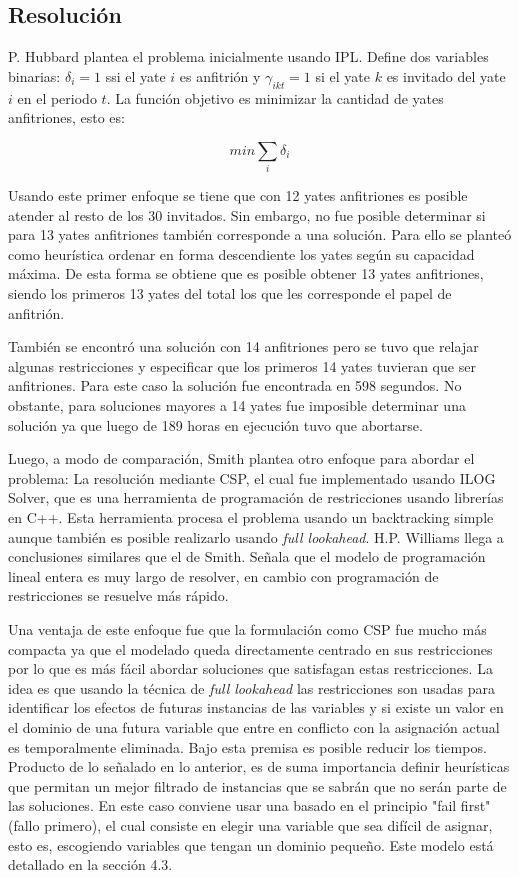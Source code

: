 \documentclass[letter, 10pt]{article}
\begin{document}
\subsection{Resolución}

P. Hubbard plantea el problema inicialmente usando IPL\cite{Smith1996}. Define dos variables binarias: $\delta_i=1$ ssi el yate $i$ es anfitrión y $\gamma_{ikt}=1$ si el yate $k$ es invitado del yate $i$ en el periodo $t$. La función objetivo es minimizar la cantidad de yates anfitriones, esto es:

\begin{equation}
    min \sum_i \delta_i
\end{equation}

Usando este primer enfoque se tiene que con 12 yates anfitriones es posible atender al resto de los 30 invitados. Sin embargo, no fue posible determinar si para 13 yates anfitriones también corresponde a una solución. Para ello se planteó como heurística ordenar en forma descendiente los yates según su capacidad máxima. De esta forma se obtiene que es posible obtener 13 yates anfitriones, siendo los primeros 13 yates del total los que les corresponde el papel de anfitrión.

También se encontró una solución con 14 anfitriones pero se tuvo que relajar algunas restricciones y especificar que los primeros 14 yates tuvieran que ser anfitriones. Para este caso la solución fue encontrada en 598 segundos. No obstante, para soluciones mayores a 14 yates fue imposible determinar una solución ya que luego de 189 horas en ejecución tuvo que abortarse.

Luego, a modo de comparación, Smith plantea otro enfoque para abordar el problema: La resolución mediante CSP, el cual fue implementado usando ILOG Solver\cite{Puget94ac++}, que es una herramienta de programación de restricciones usando librerías en C++. Esta herramienta procesa el problema usando un backtracking simple aunque también es posible realizarlo usando \textit{full lookahead}. H.P. Williams\cite{Williams92} llega a conclusiones similares que el de Smith. Señala que el modelo de programación lineal entera es muy largo de resolver, en cambio con programación de restricciones se resuelve más rápido.

Una ventaja de este enfoque fue que la formulación como CSP fue mucho más compacta ya que el modelado queda directamente centrado en sus restricciones por lo que es más fácil abordar soluciones que satisfagan estas restricciones. La idea es que usando la técnica de \textit{full lookahead} las restricciones son usadas para identificar los efectos de futuras instancias de las variables y si existe un valor en el dominio de una futura variable que entre en conflicto con la asignación actual es temporalmente eliminada. Bajo esta premisa es posible reducir los tiempos. Producto de lo señalado en lo anterior, es de suma importancia definir heurísticas que permitan un mejor filtrado de instancias que se sabrán que no serán parte de las soluciones. En este caso conviene usar una basado en el principio "fail first" (fallo primero), el cual consiste en elegir una variable que sea difícil de asignar, esto es, escogiendo variables que tengan un dominio pequeño\cite{Smith1996}. Este modelo está detallado en la sección 4.3.
\end{document}
